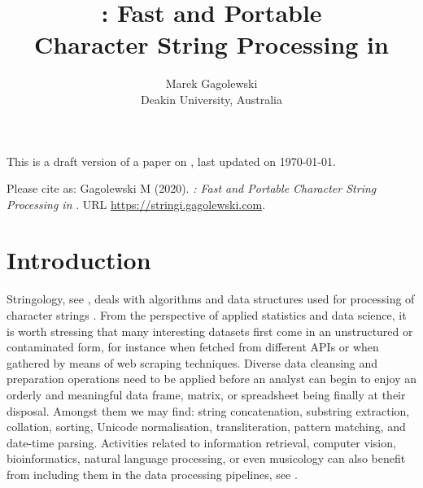 \documentclass[nojss]{jss}
\author{Marek Gagolewski\\
Deakin University, Australia} %
\title{\pkg{stringi}: Fast and Portable\\Character String Processing in \proglang{R}}
\begin{document}
{\color{blue}
This is a draft version of a paper on ,
last updated on \today.

Please cite as:
Gagolewski M (2020).
\textit{: Fast and Portable Character String Processing in }.
URL \url{https://stringi.gagolewski.com}.
}



\section{Introduction}\label{Sec:intro}

Stringology, see \citep{stringology},
deals with algorithms and data structures used for processing
of character strings \citep{speechlangproc,szpankowski}.
From the perspective of applied statistics and data science,
it is worth stressing that many interesting datasets
first come in an unstructured or contaminated form,
for instance when fetched from different APIs or when gathered
by means of web scraping techniques.
Diverse data cleansing and preparation operations \citep{datacleaning,cleanr}
need to be applied before an analyst can begin to enjoy
an orderly and meaningful data frame, matrix, or spreadsheet  being finally
at their disposal. Amongst them we may find: string concatenation,
substring extraction, collation, sorting, Unicode normalisation,
transliteration, pattern matching, and date-time parsing.
Activities related to information retrieval, computer vision,
bioinformatics, natural language processing, or even musicology
can also benefit from including them
in the data processing pipelines, see \citep{speechlangproc,genome}.







\end{document}
